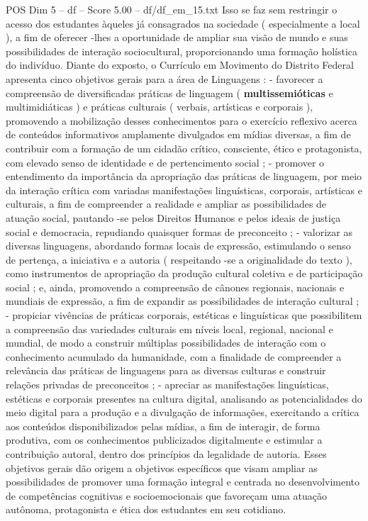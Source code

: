 \begin{textsample}{POS Dim 5 – df – Score 5.00 – df/df\_em\_15.txt}
Isso se faz sem restringir o acesso dos estudantes àqueles já consagrados na sociedade ( especialmente a local ), a fim de oferecer -lhes a oportunidade de ampliar sua visão de mundo e suas possibilidades de interação sociocultural, proporcionando uma formação holística do indivíduo.
Diante do exposto, o Currículo em Movimento do Distrito Federal apresenta cinco objetivos gerais para a área de Linguagens : - favorecer a compreensão de diversificadas práticas de linguagem ( \textbf{multissemióticas} e multimidiáticas ) e práticas culturais ( verbais, artísticas e corporais ), promovendo a mobilização desses conhecimentos para o exercício reflexivo acerca de conteúdos informativos amplamente divulgados em mídias diversas, a fim de contribuir com a formação de um cidadão crítico, consciente, ético e protagonista, com elevado senso de identidade e de pertencimento social ; - promover o entendimento da importância da apropriação das práticas de linguagem, por meio da interação crítica com variadas manifestações linguísticas, corporais, artísticas e culturais, a fim de compreender a realidade e ampliar as possibilidades de atuação social, pautando -se pelos Direitos Humanos e pelos ideais de justiça social e democracia, repudiando quaisquer formas de preconceito ; - valorizar as diversas linguagens, abordando formas locais de expressão, estimulando o senso de pertença, a iniciativa e a autoria ( respeitando -se a originalidade do texto ), como instrumentos de apropriação da produção cultural coletiva e de participação social ; e, ainda, promovendo a compreensão de cânones regionais, nacionais e mundiais de expressão, a fim de expandir as possibilidades de interação cultural ; - propiciar vivências de práticas corporais, estéticas e linguísticas que possibilitem a compreensão das variedades culturais em níveis local, regional, nacional e mundial, de modo a construir múltiplas possibilidades de interação com o conhecimento acumulado da humanidade, com a finalidade de compreender a relevância das práticas de linguagens para as diversas culturas e construir relações privadas de preconceitos ; - apreciar as manifestações linguísticas, estéticas e corporais presentes na cultura digital, analisando as potencialidades do meio digital para a produção e a divulgação de informações, exercitando a crítica aos conteúdos disponibilizados pelas mídias, a fim de interagir, de forma produtiva, com os conhecimentos publicizados digitalmente e estimular a contribuição autoral, dentro dos princípios da legalidade de autoria.
Esses objetivos gerais dão origem a objetivos específicos que visam ampliar as possibilidades de promover uma formação integral e centrada no desenvolvimento de competências cognitivas e socioemocionais que favoreçam uma atuação autônoma, protagonista e ética dos estudantes em seu cotidiano.

\end{textsample}
